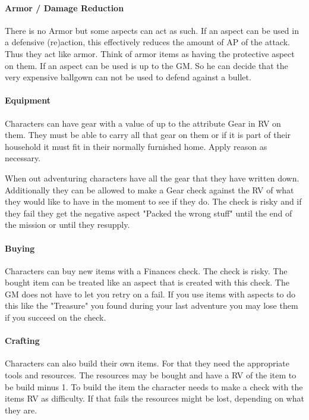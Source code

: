\documentclass[11pt]{article}
\begin{document}
{\paragraph*{Armor / Damage Reduction}
\label{sec:orgd8e5634}
There is no Armor but some aspects can act as such. If an aspect can be used in a defensive (re)action, this effectively reduces the amount of AP of the attack. Thus they act like armor. Think of armor items as having the protective aspect on them. If an aspect can be used is up to the GM. So he can decide that the very expensive ballgown can not be used to defend against a bullet.

\paragraph*{Equipment}
\label{sec:org2089c07}
Characters can have gear with a value of up to the attribute Gear in RV on them. They must be able to carry all that gear on them or if it is part of their household it must fit in their normally furnished home. Apply reason as necessary.

When out adventuring characters have all the gear that they have written down. Additionally they can be allowed to make a Gear check against the RV of what they would like to have in the moment to see if they do. The check is risky and if they fail they get the negative aspect "Packed the wrong stuff" until the end of the mission or until they resupply. 

\paragraph*{Buying}
\label{sec:orgdf74510}
Characters can buy new items with a Finances check. The check is risky. The bought item can be treated like an aspect that is created with this check. The GM does not have to let you retry on a fail. If you use items with aspects to do this like the "Treasure" you found during your last adventure you may lose them if you succeed on the check.

\paragraph*{Crafting}
\label{sec:orgca5c77d}
Characters can also build their own items. For that they need the appropriate tools and resources. The resources may be bought and have a RV of the item to be build minus 1. To build the item the character needs to make a check with the items RV as difficulty. If that fails the resources might be lost, depending on what they are.

}
\end{document}
